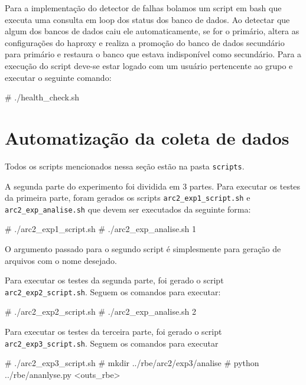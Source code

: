 \documentclass[a4paper,10pt]{article}
\begin{document}
	Para a implementação do detector de falhas bolamos um script em bash que executa uma consulta em loop dos status dos banco de dados. Ao detectar que algum dos bancos de dados caiu ele automaticamente, se for o primário, altera as configurações do haproxy e realiza a promoção do banco de dados secundário para primário e restaura o banco que estava indisponível como secundário. Para a execução do script deve-se estar logado com um usuário pertencente ao grupo e executar o seguinte comando:

       \begin{spverbatim}
# ./health_check.sh
        \end{spverbatim}

\section{Automatização da coleta de dados}

            Todos os scripts mencionados nessa seção estão na pasta \verb|scripts|.

	A segunda parte do experimento foi dividida em 3 partes. Para executar os testes da primeira parte, foram gerados os scripts \verb|arc2_exp1_script.sh| e \verb|arc2_exp_analise.sh| que devem ser executados da seguinte forma:

 	\begin{spverbatim}
	# ./arc2_exp1_script.sh
	# ./arc2_exp_analise.sh 1
	\end{spverbatim}
\noindent
\newline
O argumento passado para o segundo script é simplesmente para geração de arquivos com o nome desejado.
\newline

Para executar os testes da segunda parte, foi gerado o script \verb|arc2_exp2_script.sh|. Seguem os comandos para executar:
	\begin{spverbatim}
	# ./arc2_exp2_script.sh
	# ./arc2_exp_analise.sh 2
	\end{spverbatim}
\noindent
\newline
Para executar os testes da terceira parte, foi gerado o script \verb|arc2_exp3_script.sh|. Seguem os comandos para executar
	\begin{spverbatim}
	# ./arc2_exp3_script.sh
	# mkdir ../rbe/arc2/exp3/analise
	# python ../rbe/ananlyse.py <outs_rbe>
	\end{spverbatim}
\end{document}
